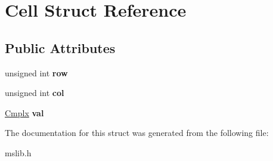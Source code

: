\hypertarget{structCell}{\section{Cell Struct Reference}
\label{structCell}
}
\subsection*{Public Attributes}
\begin{DoxyCompactItemize}
\item 
\hypertarget{structCell_a147aed65e29e05d9541ecf4df7b789b6}{unsigned int {\bfseries row}}\label{structCell_a147aed65e29e05d9541ecf4df7b789b6}

\item 
\hypertarget{structCell_abecc8cfe235cceb980929ae6ab1a29f3}{unsigned int {\bfseries col}}\label{structCell_abecc8cfe235cceb980929ae6ab1a29f3}

\item 
\hypertarget{structCell_a75182f3c8d8ede8cfec3f5e9408ba493}{\hyperlink{structCmplx}{Cmplx} {\bfseries val}}\label{structCell_a75182f3c8d8ede8cfec3f5e9408ba493}

\end{DoxyCompactItemize}


The documentation for this struct was generated from the following file\-:\begin{DoxyCompactItemize}
\item 
mslib.\-h\end{DoxyCompactItemize}
